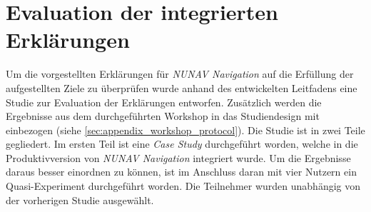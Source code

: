 \section{Evaluation der integrierten Erklärungen}
\label{sec:02_evaluation_explanations}

Um die vorgestellten Erklärungen für \textit{NUNAV Navigation} auf die Erfüllung der aufgestellten Ziele zu überprüfen wurde anhand des entwickelten Leitfadens eine Studie zur Evaluation der Erklärungen entworfen. Zusätzlich werden die Ergebnisse aus dem durchgeführten Workshop in das Studiendesign mit einbezogen (siehe \autoref{sec:appendix_workshop_protocol}). Die Studie ist in zwei Teile gegliedert. Im ersten Teil ist eine \textit{Case Study} \cite{wohlin2012experimentation} durchgeführt worden, welche in die Produktivversion von \textit{NUNAV Navigation} integriert wurde. Um die Ergebnisse daraus besser einordnen zu können, ist im Anschluss daran mit vier Nutzern ein Quasi-Experiment \cite{wohlin2012experimentation} durchgeführt worden. Die Teilnehmer wurden unabhängig von der vorherigen Studie ausgewählt.









